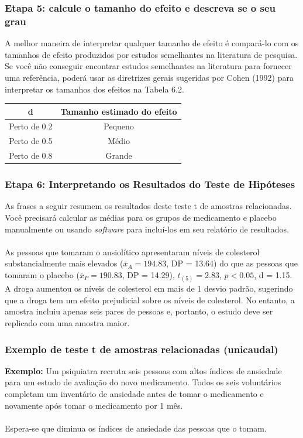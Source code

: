 \documentclass[11pt]{beamer}
\begin{document}
\begin{frame}
\frametitle{Etapa 5: calcule o tamanho do efeito e descreva se o seu grau}
A melhor maneira de interpretar qualquer tamanho de efeito é compará-lo com os tamanhos de efeito produzidos por estudos semelhantes na literatura de pesquisa. Se você não conseguir encontrar estudos semelhantes na literatura para fornecer uma referência, poderá usar as diretrizes gerais sugeridas por Cohen (1992) para interpretar os tamanhos dos efeitos na Tabela 6.2.

\begin{center}
\begin{tabular}{cc} 
 \hline
d  & Tamanho estimado do efeito\\
 \hline
Perto de 0.2 & Pequeno \\
Perto de 0.5 & Médio \\
Perto de 0.8 & Grande \\
 \hline
\end{tabular}
\end{center}   

\end{frame}

\begin{frame}
\frametitle{Etapa 6: Interpretando os Resultados do Teste de Hipóteses}

As frases a seguir resumem os resultados deste teste t de amostras relacionadas. Você precisará calcular as médias para os grupos de medicamento e placebo manualmente ou usando \textit{software} para incluí-los em seu relatório de resultados.\\~\\

As pessoas que tomaram o ansiolítico apresentaram níveis de colesterol substancialmente mais elevados (\(\bar{x}_A = 194.83\), DP = 13.64) do que as pessoas que tomaram o placebo (\(\bar{x}_P = 190.83\), DP = 14.29), \(t_{(5)} = 2.83\), \(p < 0.05\), d = 1.15. A droga aumentou os níveis de colesterol em mais de 1 desvio padrão, sugerindo que a droga tem um efeito prejudicial sobre os níveis de colesterol. No entanto, a amostra incluiu apenas seis pares de pessoas e, portanto, o estudo deve ser replicado com uma amostra maior.
\end{frame}

\begin{frame}
\frametitle{Exemplo de teste t de amostras relacionadas (unicaudal)}
\textbf{Exemplo:} Um psiquiatra recruta seis pessoas com altos índices de ansiedade para um estudo de avaliação do novo medicamento. Todos os seis voluntários completam um inventário de ansiedade antes de tomar o medicamento e novamente após tomar o medicamento por 1 mês.\\~\\ 

Espera-se que diminua os índices de ansiedade das pessoas que o tomam.
\end{frame}
\end{document}
